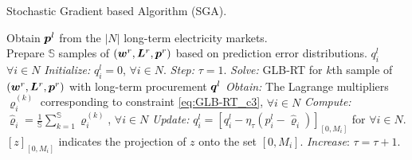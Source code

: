 
\renewcommand{\algorithmicrequire}{\textbf{Input:}}
\renewcommand{\algorithmicensure}{\textbf{Output:}}
\begin{algorithm}
	\caption{Stochastic Gradient based Algorithm (SGA).}
	\label{alg:sgea}
	\begin{algorithmic}
		\REQUIRE Obtain $\boldsymbol{p}^l$ from the $|N|$ long-term electricity markets. \\
		Prepare $\mathbb{S}$ samples of $(\boldsymbol{w}^r,\boldsymbol{L}^r,\boldsymbol{p}^r)$ based on prediction error distributions.
		\ENSURE $q^l_i$ $\forall i \in N$
		\STATE \textit{Initialize:} $q^l_i = {0}$, $\forall i \in N$. 
		\STATE \textit{Step:} $\tau=1$.
		\STATE \textit{Solve:} GLB-RT for $k$th sample of $(\boldsymbol{w}^r,\boldsymbol{L}^r,\boldsymbol{p}^r)$ with long-term procurement $\boldsymbol{q}^l$
		\STATE \textit{Obtain:} The Lagrange multipliers $\varrho_i^{(k)}$ corresponding to constraint \eqref{eq:GLB-RT_c3}, $\forall i \in N$
		\ENDFOR    
		\STATE \textit{Compute:} $\hat{\varrho}_i = \frac{1}{\mathbb{S}} \sum_{k = 1}^{\mathbb{S}} \varrho_i^{(k)}$, $\forall i \in N$
		\STATE \textit{Update:} $q^l_i = [q^l_i - \eta_{\tau} (p^l_i - \hat{\varrho}_i)]_{[0,M_i]}$ for $\forall i \in N$. $[z]_{[0,M_i]}$ indicates the projection of $z$ onto
                the set $[0,M_i].$ \STATE \textit{Increase}:
                $\tau=\tau+1$.
		\ENDWHILE
	\end{algorithmic}
\end{algorithm}


